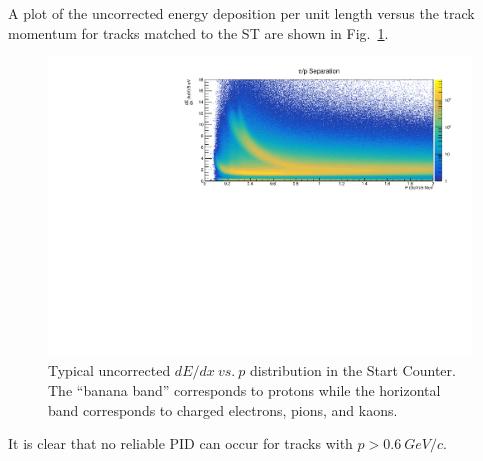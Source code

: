 A plot of the uncorrected energy deposition per unit length versus the track momentum for tracks matched to the ST are shown in Fig.~\ref{fig:dEdx_vs_p_uncorr}.
	\begin{figure}[!htb]
	\centering
	\includegraphics[width=1.0\columnwidth]{calibration/figs/NoCorr_ATT}
	\caption{Typical uncorrected $dE/dx\ vs.\ p$ distribution in the Start Counter.  The ``banana band'' corresponds to protons while the horizontal band corresponds to charged electrons, pions, and kaons.}
	\label{fig:dEdx_vs_p_uncorr}
	\end{figure}  
It is clear that no reliable PID can occur for tracks with $p > 0.6\ GeV/c$.

